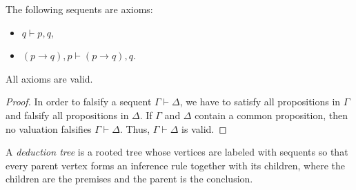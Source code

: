 \begin{page}
\setcounter{section}{2}
\setcounter{subsection}{5}
\setcounter{dfn}{11}
\label{portion:451}

\begin{exl}
The following sequents are axioms:
\begin{itemize}
\item $q \vdash p, q$,
\item $(p \to q), p \vdash (p \to q), q$.
\end{itemize}
\end{exl}

\end{page}

\begin{page}
\setcounter{section}{2}
\setcounter{subsection}{5}
\setcounter{dfn}{12}
\label{portion:454}

\begin{lem}
\label{lem:AxiomValid}
All axioms are valid.
\end{lem}

\end{page}

\begin{page}
\setcounter{section}{2}
\setcounter{subsection}{5}
\setcounter{dfn}{12}
\label{portion:455}

\begin{proof}
In order to falsify a sequent $\Gamma \vdash \Delta$, we have to satisfy all propositions in $\Gamma$ and falsify all propositions in $\Delta$.
If $\Gamma$ and $\Delta$ contain a common proposition, then no valuation falsifies $\Gamma \vdash \Delta$.
Thus, $\Gamma \vdash \Delta$ is valid.
\end{proof}


\end{page}

\begin{page}
\setcounter{section}{2}
\setcounter{subsection}{5}
\setcounter{dfn}{13}
\label{portion:457}

\begin{dfn}
\label{dfn:DeductionTree}
A \emph{deduction tree} is a rooted tree whose vertices are labeled with sequents so that
every parent vertex forms an inference rule together with its children, where the children are the premises and the parent is the conclusion.
\end{dfn}

\end{page}

